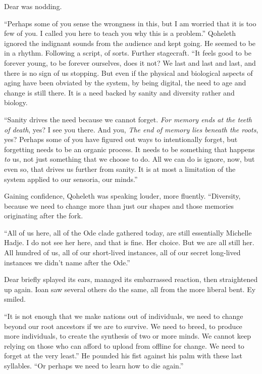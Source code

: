 Dear was nodding.

``Perhaps some of you sense the wrongness in this, but I am worried that it is too few of you. I called you here to teach you why this is a problem.'' Qoheleth ignored the indignant sounds from the audience and kept going. He seemed to be in a rhythm. Following a script, of sorts. Further stagecraft. ``It feels good to be forever young, to be forever ourselves, does it not? We last and last and last, and there is no sign of us stopping. But even if the physical and biological aspects of aging have been obviated by the system, by being digital, the need to age and change is still there. It is a need backed by sanity and diversity rather and biology.

``Sanity drives the need because we cannot forget. \emph{For memory ends at the teeth of death}, yes? I see you there. And you, \emph{The end of memory lies beneath the roots}, yes? Perhaps some of you have figured out ways to intentionally forget, but forgetting needs to be an organic process. It needs to be something that happens \emph{to} us, not just something that we choose to do. All we can do is ignore, now, but even so, that drives us further from sanity. It is at most a limitation of the system applied to our sensoria, our minds.''

Gaining confidence, Qoheleth was speaking louder, more fluently. ``Diversity, because we need to change more than just our shapes and those memories originating after the fork.

``All of us here, all of the Ode clade gathered today, are still essentially Michelle Hadje. I do not see her here, and that is fine. Her choice. But we are all still her. All hundred of us, all of our short-lived instances, all of our secret long-lived instances we didn't name after the Ode.''

Dear briefly splayed its ears, managed its embarrassed reaction, then straightened up again. Ioan saw several others do the same, all from the more liberal bent. Ey smiled.

``It is not enough that we make nations out of individuals, we need to change beyond our root ancestors if we are to survive. We need to breed, to produce more individuals, to create the synthesis of two or more minds. We cannot keep relying on those who can afford to upload from offline for change. We need to forget at the very least.'' He pounded his fist against his palm with these last syllables. ``Or perhaps we need to learn how to die again.''

